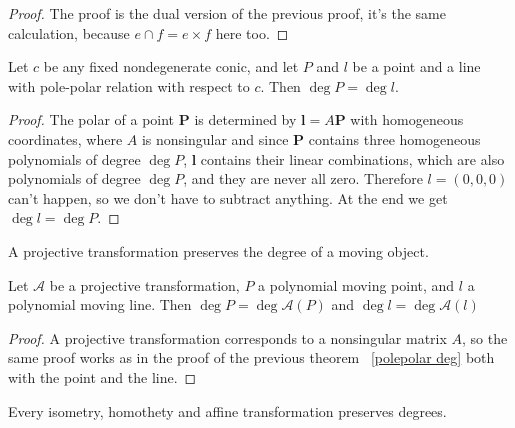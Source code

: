 \documentclass[a4paper]{article}
\begin{document}
\begin{proof}
    The proof is the dual version of the previous proof, it's the same calculation, because $e\cap f=e\times f$ here too.
\end{proof}




\begin{theorem}\label{polepolar deg}
    Let $c$ be any fixed nondegenerate conic, and let $P$ and $l$ be a point and a line with pole-polar relation with respect to $c$. Then $\deg P=\deg l$.
\end{theorem}

\begin{proof}
    The polar of a point $\mathbf{P}$ is determined by $\mathbf{l}=A\mathbf{P}$ with homogeneous coordinates, where $A$ is nonsingular and since $\mathbf{P}$ contains three homogeneous polynomials of degree $\deg P$, $\mathbf{l}$ contains their linear combinations, which are also polynomials of degree $\deg P$, and they are never all zero. Therefore $l=(0,0,0)$ can't happen, so we don't have to subtract anything. At the end we get $\deg l= \deg P$.
\end{proof}

A projective transformation preserves the degree of a moving object.

\begin{theorem}
    Let $\mathcal{A}$ be a projective transformation, $P$ a polynomial moving point, and $l$ a polynomial moving line. Then $\deg P=\deg \mathcal{A}(P)$ and $\deg l=\deg \mathcal{A}(l)$
\end{theorem}

\begin{proof}
    A projective transformation corresponds to a nonsingular matrix $A$, so the same proof works as in the proof of the previous theorem ~\ref{polepolar deg} both with the point and the line.
\end{proof}

\begin{corollary}
    Every isometry, homothety and affine transformation preserves degrees.
\end{corollary}
\end{document}
